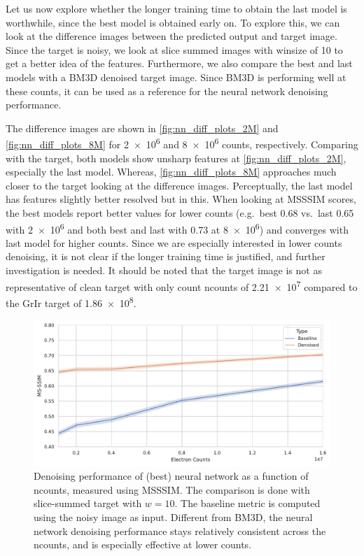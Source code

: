 Let us now explore whether the longer training time to obtain the last model is worthwhile, since the best model is obtained early on. To explore this,  we can look at the difference images between the predicted output and target image. Since the target is noisy, we look at slice summed images with \gls{winsize} of \num{10} to get a better idea of the features. Furthermore, we also compare the best and last models with a BM3D denoised target image. Since BM3D is performing well at these counts, it can be used as a reference for the neural network denoising performance.

The difference images are shown in \cref{fig:nn_diff_plots_2M} and \cref{fig:nn_diff_plots_8M} for \num{2e6} and \num{8e6} counts, respectively. Comparing with the target, both models show unsharp features at \cref{fig:nn_diff_plots_2M}, especially the last model. Whereas, \cref{fig:nn_diff_plots_8M} approaches much closer to the target looking at the difference images. Perceptually, the last model has features slightly better resolved but in this. When looking at \gls{MSSSIM} scores, the best models report better values for lower counts (e.g.\ best \num{0.68} vs.\ last \num{0.65} with \num{2e6} and both best and last with \num{0.73} at \num{8e6}) and converges with last model for higher counts. Since we are especially interested in lower counts denoising, it is not clear if the longer training time is justified, and further investigation is needed. It should be noted that the target image is not as representative of clean target with only count \gls{ncounts} of \num{2.21e7} compared to the \gls{GrIr} target of \num{1.86e8}.

\begin{figure}
    \centering
    \includegraphics[width=1\linewidth]{images/nn_gdw_msssim.pdf}
    \caption{Denoising performance of (best) neural network as a function of \gls{ncounts}, measured using \gls{MSSSIM}. The comparison is done with slice-summed target with $w=10$. The baseline metric is computed using the noisy image as input. Different from \gls{BM3D}, the neural network denoising performance stays relatively consistent across the \gls{ncounts}, and is especially effective at lower counts.}
    \label{fig:gdw-test-metirc}
\end{figure}


